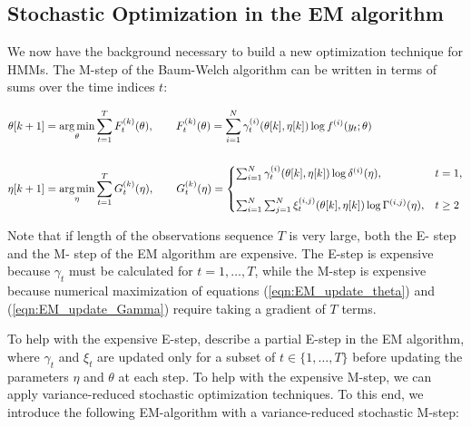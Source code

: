 \subsection{Stochastic Optimization in the EM algorithm}

We now have the background necessary to build a new optimization technique for HMMs. The M-step of the Baum-Welch algorithm can be written in terms of sums over the time indices $t$:

\begin{align}
    \theta[k+1] &= \operatorname*{arg\,min}_{\theta} \sum_{t=1}^T F_t^{(k)}(\theta), \qquad F_t^{(k)}(\theta) = \sum_{i=1}^N \gamma^{(i)}_t(\theta[k], \eta[k]) \log f^{(i)}(y_t;\theta) \label{eqn:F} \\ \nonumber \\
    \eta[k+1] &= \operatorname*{arg\,min}_{\eta} \sum_{t=1}^{T} G_t^{(k)}(\eta), 
    \qquad G_t^{(k)}(\eta) = 
    \begin{cases}
        \sum_{i=1}^N \gamma^{(i)}_t(\theta[k],\eta[k]) \log \delta^{(i)}(\eta), & t = 1, \\\\
        \sum_{i=1}^N \sum_{j=1}^N \xi^{(i,j)}_t(\theta[k], \eta[k]) \log \Gamma^{(i,j)}(\eta), & t \geq 2
    \end{cases}
    \label{eqn:G}
\end{align}


Note that if length of the observations sequence $T$ is very large, %
both the E- step and the M- step of the EM algorithm are expensive. The E-step is expensive because $\gamma_t$ must be calculated for $t = 1,\ldots,T$, while the M-step is expensive because numerical maximization of equations (\ref{eqn:EM_update_theta}) and (\ref{eqn:EM_update_Gamma}) require taking a gradient of $T$ terms.

To help with the expensive E-step, \citet{Neal:1998} describe a partial E-step in the EM algorithm, where $\gamma_t$ and $\xi_t$ are updated only for a subset of $t \in \{1,\ldots,T\}$ before updating the parameters $\eta$ and $\theta$ at each step. To help with the expensive M-step, we can apply variance-reduced stochastic optimization techniques. To this end, we introduce the following EM-algorithm with a variance-reduced stochastic M-step:


